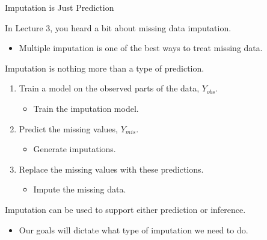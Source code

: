 \documentclass{beamer}\usepackage[]{graphicx}\usepackage[]{color}
\begin{document}
\begin{frame}{Imputation is Just Prediction}
  
  In Lecture 3, you heard a bit about missing data imputation.
  \begin{itemize}
  \item Multiple imputation is one of the best ways to treat missing data.
  \end{itemize}
  \vb
  Imputation is nothing more than a type of prediction.
  \begin{enumerate}
  \item Train a model on the observed parts of the data, $Y_{obs}$.
    \begin{itemize}
    \item Train the imputation model.
    \end{itemize}
  \item Predict the missing values, $Y_{mis}$.
    \begin{itemize}
    \item Generate imputations.
    \end{itemize}
  \item Replace the missing values with these predictions.
    \begin{itemize}
    \item Impute the missing data.
    \end{itemize}
  \end{enumerate}
  \vb
  Imputation can be used to support either prediction or inference.
  \begin{itemize}
  \item Our goals will dictate what type of imputation we need to do.
  \end{itemize}
  
\end{frame}

\end{document}
